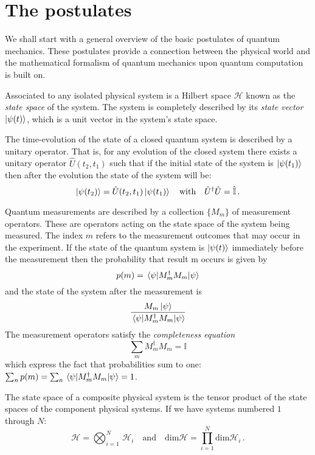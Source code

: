 \section{The postulates}
We shall start with a general overview of the basic postulates of quantum mechanics. These postulates provide a connection between the physical world and the mathematical formalism of quantum mechanics upon quantum computation is built on.
\begin{postulate}\label{postulate:1}
Associated to any isolated physical system is a Hilbert space $\mathcal{H}$ known as the \emph{state space} of the
system. The system is completely described by its \emph{state vector} $\ket{\psi(t)}$, which is a unit
vector in the system’s state space.
\end{postulate}
\begin{postulate}
The time-evolution of the state of a closed quantum system is described by a
unitary operator. That is, for any evolution of the closed system there exists
a unitary operator $\widehat{U}(t_2,t_1)$ such that if the initial state of the system is $\ket{\psi(t_1)}$ then
after the evolution the state of the system will be:
\begin{equation*}
    \ket{\psi(t_2)} = \hat{U}(t_2,t_1) \ket{\psi(t_1)} \quad \text{with} \quad \hat{U}^\dagger\hat{U} = \hat{\mathbb{I}}\,.
\end{equation*}
\end{postulate}
\begin{postulate}
Quantum measurements are described by a collection $\{M_m\}$ of
measurement operators. These are operators acting on the state space of the
system being measured. The index $m$ refers to the measurement outcomes that
may occur in the experiment. If the state of the quantum system is $\ket{\psi(t)}$
immediately before the measurement then the probability that result m occurs is given by
\begin{equation*}
    p(m) = \expval{M^\dagger_m M_m}{\psi}
\end{equation*}
and the state of the system after the measurement is
\begin{equation*}
    \frac{M_m\ket{\psi}}{\expval{M^\dagger_m M_m}{\psi}}
\end{equation*}
The measurement operators satisfy the \emph{completeness equation}
\begin{equation*}
    \sum_m M_m^\dagger M_m = \mathbb{I}
\end{equation*}
which express the fact that probabilities sum to one: $\sum_n p(m) = \sum_n \expval{M^\dagger_m M_m}{\psi} = 1$.
\end{postulate}
\begin{postulate}\label{postulate:4}
The state space of a composite physical system is the tensor product
of the state spaces of the component physical systems. If we have systems numbered $1$ through $N$:
\begin{equation*}
   \mathcal{H} = \bigotimes_{i=1}^{N}\,\mathcal{H}_i \quad  \text{and} \quad \text{dim}\mathcal{H} = \prod_{i=1}^N \text{dim}\mathcal{H}_i\,.
\end{equation*}
\end{postulate}